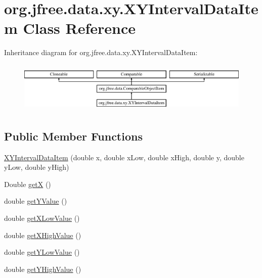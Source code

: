 \hypertarget{classorg_1_1jfree_1_1data_1_1xy_1_1_x_y_interval_data_item}{}\section{org.\+jfree.\+data.\+xy.\+X\+Y\+Interval\+Data\+Item Class Reference}
\label{classorg_1_1jfree_1_1data_1_1xy_1_1_x_y_interval_data_item}
Inheritance diagram for org.\+jfree.\+data.\+xy.\+X\+Y\+Interval\+Data\+Item\+:\begin{figure}[H]
\begin{center}
\leavevmode
\includegraphics[height=2.456140cm]{classorg_1_1jfree_1_1data_1_1xy_1_1_x_y_interval_data_item}
\end{center}
\end{figure}
\subsection*{Public Member Functions}
\begin{DoxyCompactItemize}
\item 
\mbox{\hyperlink{classorg_1_1jfree_1_1data_1_1xy_1_1_x_y_interval_data_item_a799d062628e39990aa1a676048485374}{X\+Y\+Interval\+Data\+Item}} (double x, double x\+Low, double x\+High, double y, double y\+Low, double y\+High)
\item 
Double \mbox{\hyperlink{classorg_1_1jfree_1_1data_1_1xy_1_1_x_y_interval_data_item_a558b8110025d81ecdf70d87464611326}{getX}} ()
\item 
double \mbox{\hyperlink{classorg_1_1jfree_1_1data_1_1xy_1_1_x_y_interval_data_item_ac52f103bfad819bead350722b74bdded}{get\+Y\+Value}} ()
\item 
double \mbox{\hyperlink{classorg_1_1jfree_1_1data_1_1xy_1_1_x_y_interval_data_item_ab8f63d6d5cc7fcff8107b3a6630f4a50}{get\+X\+Low\+Value}} ()
\item 
double \mbox{\hyperlink{classorg_1_1jfree_1_1data_1_1xy_1_1_x_y_interval_data_item_a99bbdba9e2abfd2161aa49677bb79570}{get\+X\+High\+Value}} ()
\item 
double \mbox{\hyperlink{classorg_1_1jfree_1_1data_1_1xy_1_1_x_y_interval_data_item_ad5fd67a40029d45d3b41f0c1ef2be7ad}{get\+Y\+Low\+Value}} ()
\item 
double \mbox{\hyperlink{classorg_1_1jfree_1_1data_1_1xy_1_1_x_y_interval_data_item_a7e3a86ddf5bb987cc13f29559702a52d}{get\+Y\+High\+Value}} ()
\end{DoxyCompactItemize}
